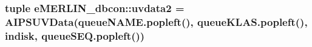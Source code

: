 \hypertarget{namespacee_m_e_r_l_i_n__dbcon_af2aa3e117609642e2b32301d834da77b}{
\subsubsection[{uvdata2}]{\setlength{\rightskip}{0pt plus 5cm}tuple {\bf e\-M\-E\-R\-L\-I\-N\-\_\-dbcon\-::uvdata2} = \-A\-I\-P\-S\-U\-V\-Data(queue\-N\-A\-M\-E.\-popleft(), queue\-K\-L\-A\-S.\-popleft(), {\bf indisk}, queue\-S\-E\-Q.\-popleft())}}\label{namespacee_m_e_r_l_i_n__dbcon_af2aa3e117609642e2b32301d834da77b}

